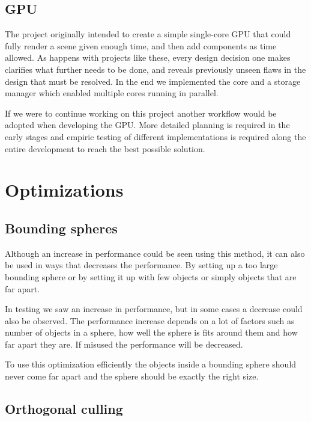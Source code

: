 		\subsection{GPU} 
		
			The project originally intended to create a simple single-core GPU
			that could fully render a scene given enough time, and then add	
			components as time allowed. As happens with projects like these,
			every design decision one makes clarifies what further needs to be
			done, and reveals previously unseen flaws in the design that must
			be resolved. In the end we implemented the core and a storage 
			manager which enabled multiple cores running in parallel.

			If we were to continue working on this project another workflow would be
			adopted when developing the GPU. More detailed planning is required in
			the early stages and empiric testing of different implementations is
			required along the entire development to reach the best possible
			solution.

	\section{Optimizations} \label{optimization}

		\subsection{Bounding spheres}

			Although an increase in performance could be seen using this
			method, it can also be used in ways that decreases the performance.
			By setting up a too large bounding sphere or by setting it up with
			few objects or simply objects that are far apart.

			In testing we saw an increase in performance, but in some cases 
			a decrease could also be observed. The performance increase depends 
			on a lot of factors such as number of objects in a sphere, how well 
			the sphere is fits around them and how far apart they are. If misused
			the performance will be decreased.

			To use this optimization efficiently the objects inside a bounding
			sphere should never come far apart and the sphere should be exactly
			the right size.

		\subsection{Orthogonal culling}

